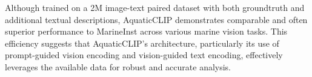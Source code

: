 Although trained on a 2M image-text paired dataset with both groundtruth and additional textual descriptions, AquaticCLIP demonstrates comparable and often superior performance to MarineInst across various marine vision tasks. 
This efficiency suggests that AquaticCLIP's architecture, particularly its use of prompt-guided vision encoding and vision-guided text encoding, effectively leverages the available data for robust and accurate analysis.


\ifCLASSOPTIONcaptionsoff
  \newpage
\fi




\ifCLASSOPTIONcaptionsoff
  \newpage
\fi

